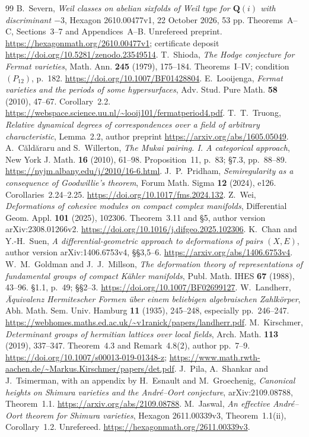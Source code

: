 \documentclass[11pt]{article}
\theoremstyle{definition}
\theoremstyle{remark}
\newcommand{\Q}{\mathbf Q}
\begin{document}
\begin{thebibliography}{99}
 B.~Severn,
\emph{Weil classes on abelian sixfolds of Weil type for $\Q(i)$ with
discriminant $-3$}, Hexagon 2610.00477v1, 22 October 2026, 53 pp.
Theorems~A--C, Sections~3--7 and Appendices~A--B. Unrefereed preprint.
\url{https://hexagonmath.org/2610.00477v1}; certificate deposit
\url{https://doi.org/10.5281/zenodo.23549514}.
 T.~Shioda, \emph{The Hodge conjecture for Fermat
varieties}, Math. Ann. \textbf{245} (1979), 175--184. Theorems~I--IV;
condition $(P_{12})$, p.~182. \url{https://doi.org/10.1007/BF01428804}.
 E.~Looijenga, \emph{Fermat varieties and the
periods of some hypersurfaces}, Adv. Stud. Pure Math. \textbf{58}
(2010), 47--67. Corollary~2.2.
\url{https://webspace.science.uu.nl/~looij101/fermatperiod4.pdf}.
 T.~T.~Truong, \emph{Relative dynamical degrees
of correspondences over a field of arbitrary characteristic},
Lemma~2.2, author preprint \url{https://arxiv.org/abs/1605.05049}.
 A.~C\u{a}ld\u{a}raru and S.~Willerton,
\emph{The Mukai pairing. I. A categorical approach},
New York J. Math. \textbf{16} (2010), 61--98. Proposition~11,
p.~83; \S7.3, pp.~88--89.
\url{https://nyjm.albany.edu/j/2010/16-6.html}.
 J.~P.~Pridham, \emph{Semiregularity as a consequence
of Goodwillie's theorem}, Forum Math. Sigma \textbf{12} (2024), e126.
Corollaries~2.24--2.25. \url{https://doi.org/10.1017/fms.2024.132}.
 Z.~Wei, \emph{Deformations of cohesive modules
on compact complex manifolds}, Differential Geom. Appl.
\textbf{101} (2025), 102306. Theorem~3.11 and \S5, author version
arXiv:2308.01266v2. \url{https://doi.org/10.1016/j.difgeo.2025.102306}.
 K.~Chan and Y.-H.~Suen,
\emph{A differential-geometric approach to deformations of pairs
$(X,E)$}, author version arXiv:1406.6753v4, \S\S3,5--6.
\url{https://arxiv.org/abs/1406.6753v4}.
 W.~M.~Goldman and J.~J.~Millson,
\emph{The deformation theory of representations of fundamental groups
of compact K\"ahler manifolds}, Publ. Math. IHES \textbf{67}
(1988), 43--96. \S1.1, p.~49; \S\S2--3.
\url{https://doi.org/10.1007/BF02699127}.
 W.~Landherr,
\emph{\"Aquivalenz Hermitescher Formen \"uber einem beliebigen
algebraischen Zahlk\"orper}, Abh. Math. Sem. Univ. Hamburg
\textbf{11} (1935), 245--248, especially pp.~246--247.
\url{https://webhomes.maths.ed.ac.uk/~v1ranick/papers/landherr.pdf}.
 M.~Kirschmer,
\emph{Determinant groups of hermitian lattices over local fields},
Arch. Math. \textbf{113} (2019), 337--347.
Theorem~4.3 and Remark~4.8(2), author pp.~7--9.
\url{https://doi.org/10.1007/s00013-019-01348-z};
\url{https://www.math.rwth-aachen.de/~Markus.Kirschmer/papers/det.pdf}.
 J.~Pila, A.~Shankar and J.~Tsimerman, with an appendix by H.~Esnault and M.~Groechenig, \emph{Canonical heights on Shimura varieties and the Andr\'e--Oort conjecture}, arXiv:2109.08788, Theorem~1.1. \url{https://arxiv.org/abs/2109.08788}.
 M.~Jaswal, \emph{An effective Andr\'e--Oort theorem for Shimura varieties}, Hexagon 2611.00339v3, Theorem~1.1(ii), Corollary~1.2. Unrefereed. \url{https://hexagonmath.org/2611.00339v3}.


\end{thebibliography}
\end{document}
